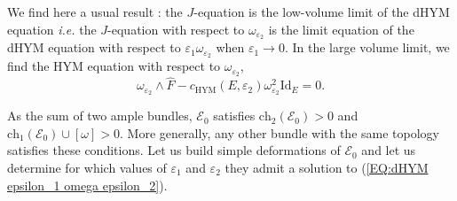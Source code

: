 \documentclass{article}
\theoremstyle{remark}
\theoremstyle{definition}
\newcommand{\Id}{\mathrm{Id}}
\newcommand{\E}{\mathcal{E}}
\newcommand{\ch}{\mathrm{ch}}
\begin{document}
We find here a usual result : the $J$-equation is the low-volume limit of the dHYM equation \textit{i.e.} the $J$-equation with respect to $\omega_{\varepsilon_2}$ is the limit equation of the dHYM equation with respect to $\varepsilon_1\omega_{\varepsilon_2}$ when $\varepsilon_1 \rightarrow 0$. In the large volume limit, we find the HYM equation with respect to $\omega_{\varepsilon_2}$,
$$
\omega_{\varepsilon_2} \wedge \hat{F} - c_{\mathrm{HYM}}(E,\varepsilon_2)\omega_{\varepsilon_2}^2\Id_E = 0.
$$

As the sum of two ample bundles, $\E_0$ satisfies $\ch_2(\E_0) > 0$ and $\ch_1(\E_0) \cup [\omega] > 0$. More generally, any other bundle with the same topology satisfies these conditions. Let us build simple deformations of $\E_0$ and let us determine for which values of $\varepsilon_1$ and $\varepsilon_2$ they admit a solution to (\ref{EQ:dHYM epsilon_1 omega epsilon_2}).
\end{document}

